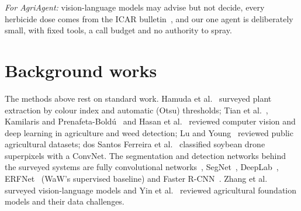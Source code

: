 \textit{For AgriAgent:} vision-language models may advise but not decide, every herbicide dose comes from
the ICAR bulletin~\cite{choudhury2016icar}, and our one agent is deliberately small, with fixed tools, a
call budget and no authority to spray.

\section{Background works}\label{sec:lit-background}
The methods above rest on standard work. Hamuda et al.~\cite{hamuda2016survey} surveyed plant extraction
by colour index and automatic (Otsu) thresholds; Tian et al.~\cite{tian2020cv}, Kamilaris and
Prenafeta-Bold\'u~\cite{kamilaris2018dl} and Hasan et al.~\cite{hasan2021survey} reviewed computer vision
and deep learning in agriculture and weed detection; Lu and Young~\cite{lu2020datasets} reviewed public
agricultural datasets; dos Santos Ferreira et al.~\cite{dossantos2017soybean} classified soybean drone
superpixels with a ConvNet. The segmentation and detection networks behind the surveyed systems are fully
convolutional networks~\cite{long2017fcn}, SegNet~\cite{badrinarayanan2017segnet},
DeepLab~\cite{chen2018deeplab}, ERFNet~\cite{romera2018erfnet} (WaW's supervised baseline) and Faster
R-CNN~\cite{ren2017fasterrcnn}. Zhang et al.~\cite{zhang2024vlmsurvey} surveyed vision-language models and
Yin et al.~\cite{yin2025foundation} reviewed agricultural foundation models and their data challenges.

